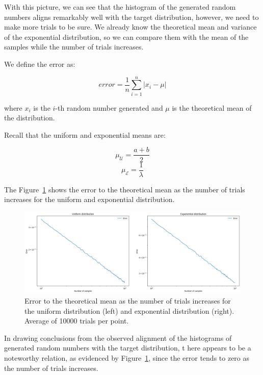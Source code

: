 \documentclass{report}
\begin{document}
With this picture, we can see that the histogram of the generated random numbers aligns remarkably well with the target distribution, however, we need to make more trials to be sure. We already know the theoretical mean and variance of the exponential distribution, so we can compare them with the mean of the samples while the number of trials increases.

We define the error as:

\begin{equation*} error = \frac{1}{n}\sum_{i=1}^{n} | x_i - \mu | \end{equation*}

where \(x_i\) is the \(i\)-th random number generated and \(\mu\) is the theoretical mean of the distribution.

Recall that the uniform and exponential means are:

\begin{equation*} \mu_{\mathcal{U}} = \frac{a + b}{2} \end{equation*}
\begin{equation*} \mu_{\mathcal{E}} = \frac{1}{\lambda} \end{equation*}

The Figure~\ref{fig:errors} shows the error to the theoretical mean as the number of trials increases for the uniform and exponential distribution.



\begin{figure}[H]
	\centering
	\includegraphics[width=0.8\linewidth]{./Figures/InverseCDF/errors.png}
	\caption{Error to the theoretical mean as the number of trials increases for the uniform distribution (left) and exponential distribution (right). Average of 10000 trials per point.}
	\label{fig:errors}
\end{figure}

In drawing conclusions from the observed alignment of the histograms of generated random numbers with the target distribution, t  here appears to be a noteworthy relation, as evidenced by Figure~\ref{fig:errors}, since the error tends to zero as the number of trials increases.
\end{document}
